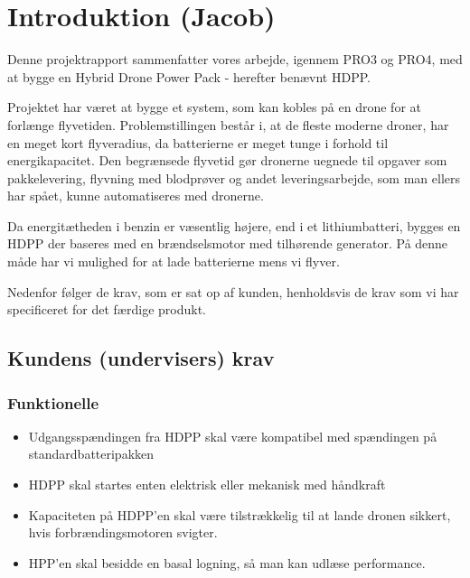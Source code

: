 
\section{Introduktion (Jacob)}
\label{sec:introduktion-1}

Denne projektrapport sammenfatter vores arbejde, igennem PRO3 og PRO4, med at bygge en Hybrid Drone Power Pack - herefter benævnt HDPP.

Projektet har været at bygge et system, som kan kobles på en drone for at forlænge flyvetiden. Problemstillingen består i, at de fleste moderne droner, har en meget kort flyveradius, da batterierne er meget tunge i forhold til energikapacitet. Den begrænsede flyvetid gør dronerne uegnede til opgaver som pakkelevering, flyvning med blodprøver og andet leveringsarbejde, som man ellers har spået, kunne automatiseres med dronerne.

Da energitætheden i benzin er væsentlig højere, end i et lithiumbatteri, bygges en HDPP der baseres med en brændselsmotor med tilhørende generator. På denne måde har vi mulighed for at lade batterierne mens vi flyver. 

Nedenfor følger de krav, som er sat op af kunden, henholdsvis de krav som vi har specificeret for det færdige produkt.

\subsection{Kundens (undervisers) krav}
\label{sec:kravsspecifikation-1}

\subsubsection{Funktionelle}
\label{sec:funktionelle}

\begin{itemize}
\item Udgangsspændingen fra HDPP skal være kompatibel med spændingen på standardbatteripakken
\item HDPP skal startes enten elektrisk eller mekanisk med håndkraft 
\item Kapaciteten på HDPP’en skal være tilstrækkelig til at lande dronen sikkert, hvis forbrændingsmotoren svigter.
\item HPP’en skal besidde en basal logning, så man kan udlæse performance.
\end{itemize}

